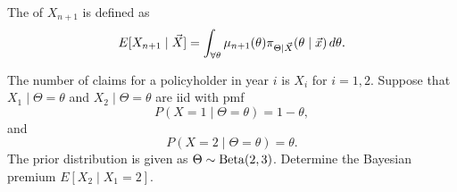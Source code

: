 \documentclass[notoc,notitlepage]{tufte-book}
\begin{document}

\begin{defn}\label{defn:bayesian_premium}
  The  of $X_{n+1}$ is defined as
  \begin{equation*}
    E[X_{n+1} \mid \vec{X}] = \int_{\forall \theta} \mu_{n+1}(\theta)
    \pi_{\Theta \mid \vec{X}}(\theta \mid \vec{x}) \mathop{}\!d{\theta}.
  \end{equation*}
\end{defn}

\begin{eg}
  The number of claims for a policyholder in year $i$ is $X_i$ for $i = 1, 2$.
  Suppose that $X_1 \mid \Theta = \theta$ and $X_2 \mid \Theta = \theta$ are iid
  with pmf
  \begin{equation*}
    P(X = 1 \mid \Theta = \theta) = 1 - \theta,
  \end{equation*}
  and
  \begin{equation*}
    P(X = 2 \mid \Theta = \theta) = \theta.
  \end{equation*}
  The prior distribution is given as $\Theta \sim \operatorname{Beta}(2, 3)$. Determine
  the Bayesian premium $E[X_2 \mid X_1 = 2]$.
\end{eg}
\end{document}
